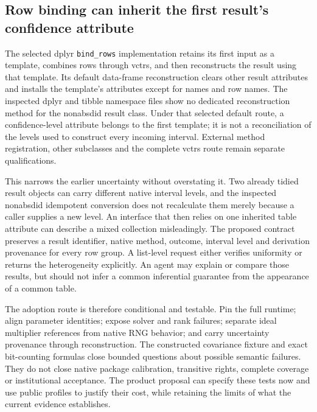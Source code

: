 \subsection{Row binding can inherit the first result's confidence attribute}

The selected dplyr \texttt{bind\_rows} implementation retains its first input as a template, combines rows through vctrs, and then reconstructs the result using that template. Its default data-frame reconstruction clears other result attributes and installs the template's attributes except for names and row names. The inspected dplyr and tibble namespace files show no dedicated reconstruction method for the nonabsdid result class. Under that selected default route, a confidence-level attribute belongs to the first template; it is not a reconciliation of the levels used to construct every incoming interval. External method registration, other subclasses and the complete vctrs route remain separate qualifications.\citep{exec29_panel_runtime_sources}

This narrows the earlier uncertainty without overstating it. Two already tidied result objects can carry different native interval levels, and the inspected nonabsdid idempotent conversion does not recalculate them merely because a caller supplies a new level. An interface that then relies on one inherited table attribute can describe a mixed collection misleadingly. The proposed contract preserves a result identifier, native method, outcome, interval level and derivation provenance for every row group. A list-level request either verifies uniformity or returns the heterogeneity explicitly. An agent may explain or compare those results, but should not infer a common inferential guarantee from the appearance of a common table.\citep{exec29_panel_inference_sources,exec29_panel_runtime_sources}

The adoption route is therefore conditional and testable. Pin the full runtime; align parameter identities; expose solver and rank failures; separate ideal multiplier references from native RNG behavior; and carry uncertainty provenance through reconstruction. The constructed covariance fixture and exact bit-counting formulas close bounded questions about possible semantic failures. They do not close native package calibration, transitive rights, complete coverage or institutional acceptance. The product proposal can specify these tests now and use public profiles to justify their cost, while retaining the limits of what the current evidence establishes.\citep{exec29_panel_runtime_sources,exec29_panel_runtime_reference}
